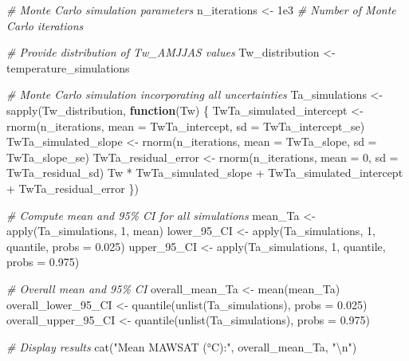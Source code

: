 \documentclass[
]{article}
\newenvironment{Shaded}{\begin{snugshade}}{\end{snugshade}}
\newcommand{\AttributeTok}[1]{\textcolor[rgb]{0.77,0.63,0.00}{#1}}
\newcommand{\CommentTok}[1]{\textcolor[rgb]{0.56,0.35,0.01}{\textit{#1}}}
\newcommand{\ControlFlowTok}[1]{\textcolor[rgb]{0.13,0.29,0.53}{\textbf{#1}}}
\newcommand{\DecValTok}[1]{\textcolor[rgb]{0.00,0.00,0.81}{#1}}
\newcommand{\FloatTok}[1]{\textcolor[rgb]{0.00,0.00,0.81}{#1}}
\newcommand{\FunctionTok}[1]{\textcolor[rgb]{0.00,0.00,0.00}{#1}}
\newcommand{\NormalTok}[1]{#1}
\newcommand{\OtherTok}[1]{\textcolor[rgb]{0.56,0.35,0.01}{#1}}
\newcommand{\SpecialCharTok}[1]{\textcolor[rgb]{0.00,0.00,0.00}{#1}}
\newcommand{\StringTok}[1]{\textcolor[rgb]{0.31,0.60,0.02}{#1}}
\begin{document}
\begin{Shaded}
\begin{Highlighting}[]
\CommentTok{\# Monte Carlo simulation parameters}
\NormalTok{n\_iterations }\OtherTok{\textless{}{-}} \FloatTok{1e3} \CommentTok{\# Number of Monte Carlo iterations}

\CommentTok{\# Provide distribution of Tw\_AMJJAS values}
\NormalTok{Tw\_distribution }\OtherTok{\textless{}{-}}\NormalTok{ temperature\_simulations}

\CommentTok{\# Monte Carlo simulation incorporating all uncertainties}
\NormalTok{Ta\_simulations }\OtherTok{\textless{}{-}} \FunctionTok{sapply}\NormalTok{(Tw\_distribution, }\ControlFlowTok{function}\NormalTok{(Tw) \{}
\NormalTok{  TwTa\_simulated\_intercept }\OtherTok{\textless{}{-}} \FunctionTok{rnorm}\NormalTok{(n\_iterations, }\AttributeTok{mean =}\NormalTok{ TwTa\_intercept, }\AttributeTok{sd =}\NormalTok{ TwTa\_intercept\_se)}
\NormalTok{  TwTa\_simulated\_slope }\OtherTok{\textless{}{-}} \FunctionTok{rnorm}\NormalTok{(n\_iterations, }\AttributeTok{mean =}\NormalTok{ TwTa\_slope, }\AttributeTok{sd =}\NormalTok{ TwTa\_slope\_se)}
\NormalTok{  TwTa\_residual\_error }\OtherTok{\textless{}{-}} \FunctionTok{rnorm}\NormalTok{(n\_iterations, }\AttributeTok{mean =} \DecValTok{0}\NormalTok{, }\AttributeTok{sd =}\NormalTok{ TwTa\_residual\_sd)}
\NormalTok{  Tw }\SpecialCharTok{*}\NormalTok{ TwTa\_simulated\_slope }\SpecialCharTok{+}\NormalTok{ TwTa\_simulated\_intercept }\SpecialCharTok{+}\NormalTok{ TwTa\_residual\_error}
\NormalTok{\})}

\CommentTok{\# Compute mean and 95\% CI for all simulations}
\NormalTok{mean\_Ta }\OtherTok{\textless{}{-}} \FunctionTok{apply}\NormalTok{(Ta\_simulations, }\DecValTok{1}\NormalTok{, mean)}
\NormalTok{lower\_95\_CI }\OtherTok{\textless{}{-}} \FunctionTok{apply}\NormalTok{(Ta\_simulations, }\DecValTok{1}\NormalTok{, quantile, }\AttributeTok{probs =} \FloatTok{0.025}\NormalTok{)}
\NormalTok{upper\_95\_CI }\OtherTok{\textless{}{-}} \FunctionTok{apply}\NormalTok{(Ta\_simulations, }\DecValTok{1}\NormalTok{, quantile, }\AttributeTok{probs =} \FloatTok{0.975}\NormalTok{)}

\CommentTok{\# Overall mean and 95\% CI}
\NormalTok{overall\_mean\_Ta }\OtherTok{\textless{}{-}} \FunctionTok{mean}\NormalTok{(mean\_Ta)}
\NormalTok{overall\_lower\_95\_CI }\OtherTok{\textless{}{-}} \FunctionTok{quantile}\NormalTok{(}\FunctionTok{unlist}\NormalTok{(Ta\_simulations), }\AttributeTok{probs =} \FloatTok{0.025}\NormalTok{)}
\NormalTok{overall\_upper\_95\_CI }\OtherTok{\textless{}{-}} \FunctionTok{quantile}\NormalTok{(}\FunctionTok{unlist}\NormalTok{(Ta\_simulations), }\AttributeTok{probs =} \FloatTok{0.975}\NormalTok{)}

\CommentTok{\# Display results}
\FunctionTok{cat}\NormalTok{(}\StringTok{"Mean MAWSAT (°C):"}\NormalTok{, overall\_mean\_Ta, }\StringTok{"}\SpecialCharTok{\textbackslash{}n}\StringTok{"}\NormalTok{)}
\end{Highlighting}
\end{Shaded}
\end{document}
